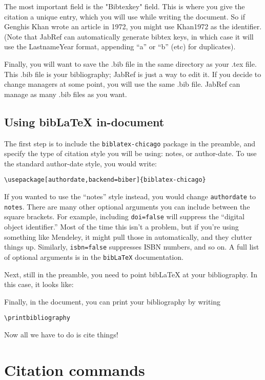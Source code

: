 \documentclass[12pt]{article}
\begin{document}
The most important field is the "Bibtexkey" field. This is where you give the citation a unique entry, which you will use while writing the document. So if Genghis Khan wrote an article in 1972, you might use Khan1972 as the identifier. (Note that JabRef can automatically generate bibtex keys, in which case it will use the LastnameYear format, appending ``a'' or ``b'' (etc) for duplicates).

Finally, you will want to save the .bib file in the same directory as your .tex file. This .bib file is your bibliography; JabRef is just a way to edit it. If you decide to change managers at some point, you will use the same .bib file. JabRef can manage as many .bib files as you want.

\subsection{Using bibLaTeX in-document}

The first step is to include the \verb+biblatex-chicago+ package in the preamble, and specify the type of citation style you will be using: notes, or author-date. To use the standard author-date style, you would write:

\verb+\usepackage[authordate,backend=biber]{biblatex-chicago}+

If you wanted to use the ``notes'' style instead, you would change \verb+authordate+ to \verb+notes+. There are many other optional arguments you can include between the square brackets. For example, including \verb+doi=false+ will suppress the ``digital object identifier.'' Most of the time this isn't a problem, but if you're using something like Mendeley, it might pull those in automatically, and they clutter things up. Similarly, \verb+isbn=false+ suppresses ISBN numbers, and so on. A full list of optional arguments is in the \verb+bibLaTeX+ documentation.

Next, still in the preamble, you need to point bibLaTeX at your bibliography. In this case, it looks like:

\verb++

Finally, in the document, you can print your bibliography by writing

\verb+\printbibliography+

Now all we have to do is cite things!

\section{Citation commands}
\end{document}
